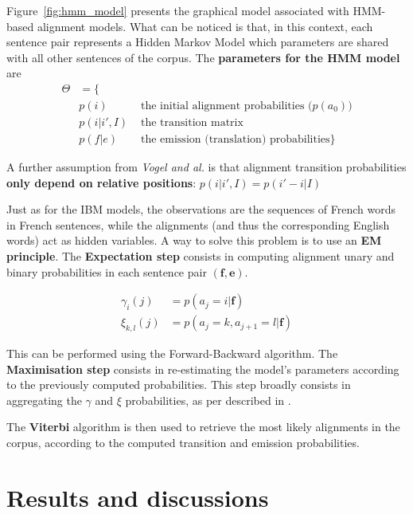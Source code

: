 \documentclass[final]{beamer}
\begin{document}
\begin{frame}[t]
\begin{multicols}{3}
Figure~\ref{fig:hmm_model} presents the graphical model associated with HMM-based alignment models. What can be noticed is that, in this context, each sentence pair represents a Hidden Markov Model which parameters are shared with all other sentences of the corpus.
The \textbf{parameters for the HMM model} are
\begin{align*}
\Theta &= \lbrace\\
& p(i) &\mbox{   the initial alignment probabilities ($p(a_0)$)}\\ 
& p(i|i',I) &\mbox{   the transition matrix}\\
& p(f|e) &\mbox{   the emission (translation) probabilities}\rbrace
\end{align*}

A further assumption from \textit{Vogel and al.} is that alignment transition probabilities \textbf{only depend on relative positions}: $p(i|i',I) = p(i'-i|I)$

Just as for the IBM models, the observations are the sequences of French words in French sentences, while the alignments (and thus the corresponding English words) act as hidden variables. A way to solve this problem is to use an \textbf{EM principle}.
The \textbf{Expectation step} consists in computing alignment unary and binary probabilities in each sentence pair $(\textbf{f},\textbf{e})$. 

\begin{align*}
\gamma_i(j) &= p(a_j=i|\textbf{f})\\
\xi_{k,l}(j) &= p(a_j=k,a_{j+1}=l|\textbf{f})
\end{align*}

This can be performed using the Forward-Backward algorithm.
The \textbf{Maximisation step} consists in re-estimating the model's parameters according to the previously computed probabilities. This step broadly consists in aggregating the $\gamma$ and $\xi$ probabilities, as per described in \cite{anahita}.

The \textbf{Viterbi} algorithm is then used to retrieve the most likely alignments in the corpus, according to the computed transition and emission probabilities.

\section{Results and discussions}

%


\end{multicols}
\end{frame}
\end{document}
